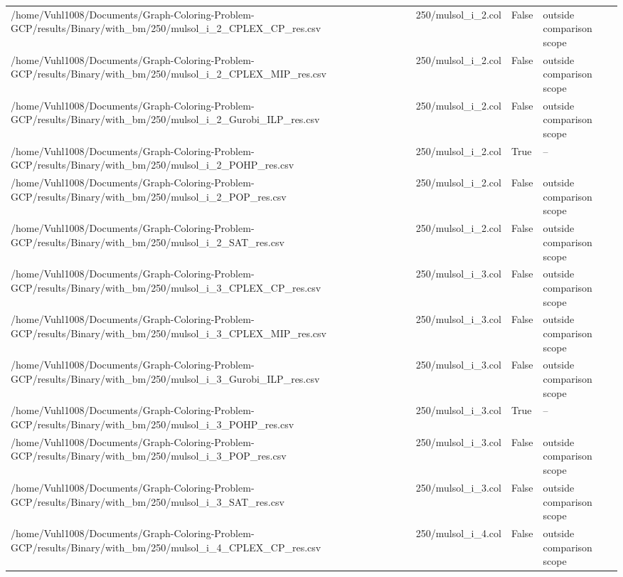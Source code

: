 \begin{table}[htbp]
\begin{tabular}{llll}
/home/Vuhl1008/Documents/Graph-Coloring-Problem-GCP/results/Binary/with\_bm/250/mulsol\_i\_2\_CPLEX\_CP\_res.csv & 250/mulsol\_i\_2.col & False & outside comparison scope \\
/home/Vuhl1008/Documents/Graph-Coloring-Problem-GCP/results/Binary/with\_bm/250/mulsol\_i\_2\_CPLEX\_MIP\_res.csv & 250/mulsol\_i\_2.col & False & outside comparison scope \\
/home/Vuhl1008/Documents/Graph-Coloring-Problem-GCP/results/Binary/with\_bm/250/mulsol\_i\_2\_Gurobi\_ILP\_res.csv & 250/mulsol\_i\_2.col & False & outside comparison scope \\
/home/Vuhl1008/Documents/Graph-Coloring-Problem-GCP/results/Binary/with\_bm/250/mulsol\_i\_2\_POHP\_res.csv & 250/mulsol\_i\_2.col & True & -- \\
/home/Vuhl1008/Documents/Graph-Coloring-Problem-GCP/results/Binary/with\_bm/250/mulsol\_i\_2\_POP\_res.csv & 250/mulsol\_i\_2.col & False & outside comparison scope \\
/home/Vuhl1008/Documents/Graph-Coloring-Problem-GCP/results/Binary/with\_bm/250/mulsol\_i\_2\_SAT\_res.csv & 250/mulsol\_i\_2.col & False & outside comparison scope \\
/home/Vuhl1008/Documents/Graph-Coloring-Problem-GCP/results/Binary/with\_bm/250/mulsol\_i\_3\_CPLEX\_CP\_res.csv & 250/mulsol\_i\_3.col & False & outside comparison scope \\
/home/Vuhl1008/Documents/Graph-Coloring-Problem-GCP/results/Binary/with\_bm/250/mulsol\_i\_3\_CPLEX\_MIP\_res.csv & 250/mulsol\_i\_3.col & False & outside comparison scope \\
/home/Vuhl1008/Documents/Graph-Coloring-Problem-GCP/results/Binary/with\_bm/250/mulsol\_i\_3\_Gurobi\_ILP\_res.csv & 250/mulsol\_i\_3.col & False & outside comparison scope \\
/home/Vuhl1008/Documents/Graph-Coloring-Problem-GCP/results/Binary/with\_bm/250/mulsol\_i\_3\_POHP\_res.csv & 250/mulsol\_i\_3.col & True & -- \\
/home/Vuhl1008/Documents/Graph-Coloring-Problem-GCP/results/Binary/with\_bm/250/mulsol\_i\_3\_POP\_res.csv & 250/mulsol\_i\_3.col & False & outside comparison scope \\
/home/Vuhl1008/Documents/Graph-Coloring-Problem-GCP/results/Binary/with\_bm/250/mulsol\_i\_3\_SAT\_res.csv & 250/mulsol\_i\_3.col & False & outside comparison scope \\
/home/Vuhl1008/Documents/Graph-Coloring-Problem-GCP/results/Binary/with\_bm/250/mulsol\_i\_4\_CPLEX\_CP\_res.csv & 250/mulsol\_i\_4.col & False & outside comparison scope \\

\end{tabular}
\end{table}
